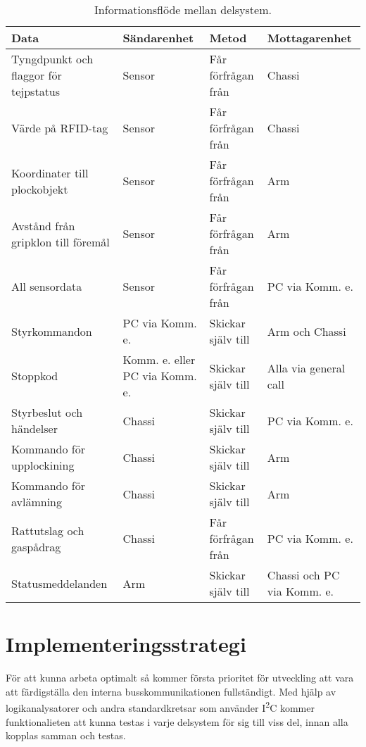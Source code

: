 \begin{table}
	\centering
	\begin{tabularx}{\textwidth}{|X|X|X|X|}
		\hline
        \textbf{Data} & \textbf{Sändarenhet} & \textbf{Metod} & \textbf{Mottagarenhet} \\
        \hline
        Tyngdpunkt och flaggor för tejpstatus & Sensor & Får förfrågan från & Chassi \\
        \hline
        Värde på RFID-tag & Sensor & Får förfrågan från & Chassi \\
        \hline
        Koordinater till plockobjekt & Sensor & Får förfrågan från & Arm \\
        \hline
        Avstånd från gripklon till föremål & Sensor  & Får förfrågan från & Arm\\
        \hline
        All sensordata & Sensor & Får förfrågan från & PC via Komm. e. \\
        \hline
        Styrkommandon & PC via Komm. e. & Skickar själv till & Arm och Chassi\\
        \hline
        Stoppkod & Komm. e. eller PC via Komm. e. & Skickar själv till & Alla via general call\\
        \hline
        Styrbeslut och händelser & Chassi & Skickar själv till & PC via Komm. e. \\
        \hline
        Kommando för upplockining & Chassi & Skickar själv till & Arm \\
        \hline
        Kommando för avlämning & Chassi & Skickar själv till & Arm \\
        \hline
        Rattutslag och gaspådrag & Chassi & Får förfrågan från & PC via Komm. e. \\
        \hline
        Statusmeddelanden & Arm & Skickar själv till & Chassi och PC via Komm. e.\\
        \hline
	\end{tabularx}
	\caption{Informationsflöde mellan delsystem.}
	\label{tab:infflöde}
\end{table}
    

\section{Implementeringsstrategi}
För att kunna arbeta optimalt så kommer första prioritet för utveckling att vara att färdigställa den interna busskommunikationen fullständigt. Med hjälp av logikanalysatorer och andra standardkretsar som använder I\textsuperscript{2}C kommer funktionalieten att kunna testas i varje delsystem för sig till viss del, innan alla kopplas samman och testas. 

